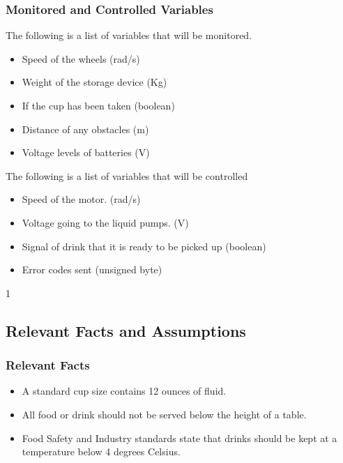 \documentclass [11pt]{article}
\begin{document}
\subsubsection{Monitored and Controlled Variables}

The following is a list of variables that will be monitored.

\begin{itemize}
	\item Speed of the wheels (rad/s)
	\item Weight of the storage device (Kg)
	\item If the cup has been taken (boolean)
	\item Distance of any obstacles (m)
	\item Voltage levels of batteries (V)
\end{itemize}

The following is a list of variables that will be controlled
\begin{itemize}
	\item Speed of the motor. (rad/s)
	\item Voltage going to the liquid pumps. (V)
	\item Signal of drink that it is ready to be picked up (boolean)
	\item Error codes sent (unsigned byte)
\end{itemize}1

\subsection{Relevant Facts and Assumptions} 

\subsubsection{Relevant Facts}
\begin{itemize}
	\item A standard cup size contains 12 ounces of fluid. 
	\item All food or drink should not be served below the height of a table.
	\item Food Safety and Industry standards state that drinks should be kept at a temperature below 4 degrees Celsius.
\end{itemize}
\end{document}
